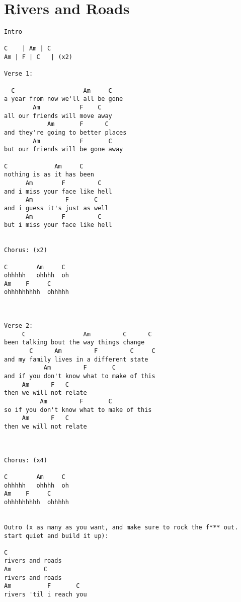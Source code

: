 \documentclass[leqno]{memoir}
\begin{document}
\chapter{Rivers and Roads}
\begin{verbatim}
Intro

C    | Am | C 
Am | F | C   | (x2)

Verse 1:

  C                   Am     C
a year from now we'll all be gone
        Am           F    C
all our friends will move away
            Am       F      C
and they're going to better places
        Am           F       C
but our friends will be gone away

C             Am     C
nothing is as it has been
      Am        F         C
and i miss your face like hell
      Am         F       C 
and i guess it's just as well
      Am        F         C        
but i miss your face like hell


Chorus: (x2)

C        Am     C  
ohhhhh   ohhhh  oh  
Am    F     C
ohhhhhhhhh  ohhhhh



Verse 2:
     C                Am         C      C
been talking bout the way things change
       C      Am         F         C     C
and my family lives in a different state
           Am         F       C
and if you don't know what to make of this
     Am      F   C
then we will not relate
          Am         F       C
so if you don't know what to make of this
     Am      F   C
then we will not relate



Chorus: (x4)

C        Am     C  
ohhhhh   ohhhh  oh  
Am    F     C
ohhhhhhhhh  ohhhhh


Outro (x as many as you want, and make sure to rock the f*** out. start quiet and build it up):

C
rivers and roads
Am         C
rivers and roads
Am          F       C
rivers 'til i reach you 

\end{verbatim}
\newpage
\end{document}
